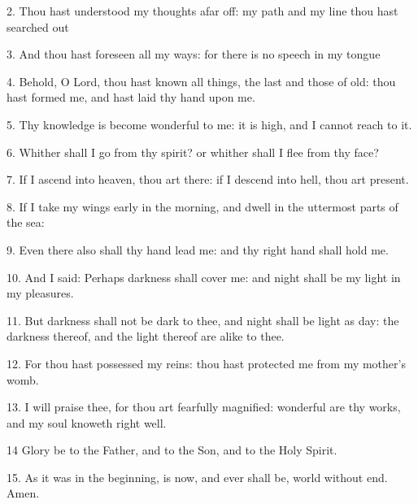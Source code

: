 2. Thou hast understood my thoughts afar off: my path and my line thou hast searched out
 	
3. And thou hast foreseen all my ways: for there is no speech in my tongue
 	
4. Behold, O Lord, thou hast known all things, the last and those of old: thou hast formed me, and hast laid thy hand upon me.
 	
5. Thy knowledge is become wonderful to me: it is high, and I cannot reach to it.
 	
6. Whither shall I go from thy spirit? or whither shall I flee from thy face?
 	
7. If I ascend into heaven, thou art there: if I descend into hell, thou art present.
 	
8. If I take my wings early in the morning, and dwell in the uttermost parts of the sea:
 	
9. Even there also shall thy hand lead me: and thy right hand shall hold me.
 	
10. And I said: Perhaps darkness shall cover me: and night shall be my light in my pleasures.
 	
11. But darkness shall not be dark to thee, and night shall be light as day: the darkness thereof, and the light thereof are alike to thee.
 	
12. For thou hast possessed my reins: thou hast protected me from my mother's womb.
 	
13. I will praise thee, for thou art fearfully magnified: wonderful are thy works, and my soul knoweth right well.
 	
14 Glory be to the Father, and to the Son, and to the Holy Spirit.
 	
15. As it was in the beginning, is now, and ever shall be, world without end. Amen.
